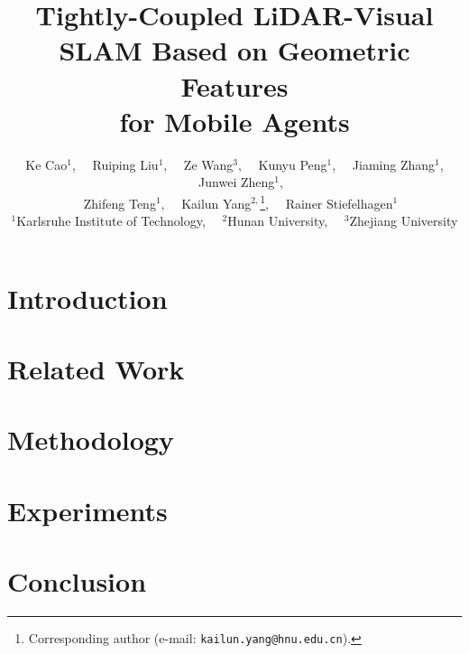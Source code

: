 \documentclass[10pt,twocolumn,letterpaper]{article}
\begin{document}
%
\title{Tightly-Coupled LiDAR-Visual SLAM Based on Geometric Features\\for Mobile Agents}

\author{
Ke Cao$^1$,
~~Ruiping Liu$^1$,
~~Ze Wang$^3$,
~~Kunyu Peng$^1$,
~~Jiaming Zhang$^1$,
~~Junwei Zheng$^1$,\\
~~Zhifeng Teng$^1$,
~~Kailun Yang$^{2,}$\thanks{Corresponding author (e-mail: {\tt kailun.yang@hnu.edu.cn}).},
~~Rainer Stiefelhagen$^1$\\
\normalsize
$^1$Karlsruhe Institute of Technology,
\normalsize
~~$^2$Hunan University,
\normalsize
~~$^3$Zhejiang University
}

\maketitle
%
\ificcvfinal\thispagestyle{empty}\fi






\section{Introduction}
\label{sec:intro}


\section{Related Work}
\label{sec:related_work}


\section{Methodology}
\label{sec:methodology}


\section{Experiments}
\label{sec:experiments}


\section{Conclusion}
\label{sec:conclusion}


\clearpage
{\small
% 


}
\end{document}
